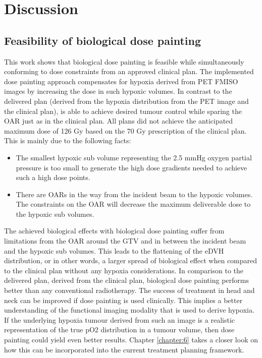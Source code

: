 \section{Discussion}
\subsection{Feasibility of biological dose painting}
This work shows that biological dose painting is feasible while simultaneously conforming to dose constraints from an approved clinical plan. The implemented dose painting approach compensates for hypoxia derived from PET FMISO images by increasing the dose in such hypoxic volumes. In contrast to the delivered plan (derived from the hypoxia distribution from the PET image and the clinical plan), is able to achieve desired tumour control while sparing the OAR just as in the clinical plan. All plans did not achieve the anticipated maximum dose of 126 Gy based on the 70 Gy prescription of the clinical plan. This is mainly due to the following facts:
\begin{itemize}
\item The smallest hypoxic sub volume representing the 2.5 mmHg oxygen partial pressure is too small to generate the high dose gradients needed to achieve such a high dose points.
\item There are OARs in the way from the incident beam to the hypoxic volumes. The constraints on the OAR will decrease the maximum deliverable dose to the hypoxic sub volumes.
\end{itemize} 
The achieved biological effects with biological dose painting suffer from limitations from the OAR around the GTV and in between the incident beam and the hypoxic sub volumes. This leads to the flattening of the eDVH distribution, or in other words, a larger spread of biological effect when compared to the clinical plan without any hypoxia considerations. In comparison to the delivered plan, derived from the clinical plan, biological dose painting performs better than any conventional radiotherapy. The success of treatment in head and neck can be improved if dose painting is used clinically. This implies a better understanding of the functional imaging modality that is used to derive hypoxia. If the underlying hypoxia tumour derived from such an image is a realistic representation of the true pO2 distribution in a tumour volume, then dose painting could yield even better results. Chapter \ref{chapter:6} takes a closer look on how this can be incorporated into the current treatment planning framework.
